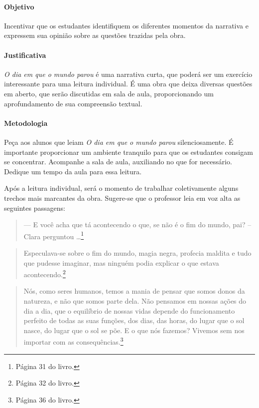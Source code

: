 \documentclass[11pt]{extarticle}
\begin{document}
\paragraph{Objetivo} Incentivar que os estudantes identifiquem os diferentes momentos da narrativa e expressem sua opinião sobre as questões trazidas pela obra.


\paragraph{Justificativa} \textit{O dia em que o mundo parou} é uma narrativa curta, que poderá ser um exercício interessante para uma leitura individual. É uma obra que deixa diversas questões em aberto, que serão discutidas em sala de aula, proporcionando um aprofundamento de sua compreensão textual.

\paragraph{Metodologia} Peça aos alunos que leiam \textit{O dia em que o mundo parou} silenciosamente. É importante proporcionar um ambiente tranquilo para que os estudantes consigam se concentrar. Acompanhe a sala de aula, auxiliando no que for necessário. Dedique um tempo da aula para essa leitura.


Após a leitura individual, será o momento de trabalhar coletivamente alguns trechos mais marcantes da obra. Sugere-se que o professor leia em voz alta as seguintes passagens:

\begin{quote}
— E você acha que tá acontecendo o que, se não é o fim do mundo, pai? – Clara perguntou \ldots{}\footnote{Página 31 do livro.}\end{quote}

\begin{quote}
Especulava-se sobre o fim do mundo, magia negra, profecia maldita e tudo que pudesse imaginar, mas ninguém podia explicar o que estava acontecendo.\footnote{Página 32 do livro.}\end{quote}

\begin{quote}
Nós, como seres humanos, temos a mania de pensar que somos donos da natureza, e não que somos parte dela. Não pensamos em nossas ações do dia a dia, que o equilíbrio de nossas vidas depende do funcionamento perfeito de todas as suas funções, dos dias, das horas, do lugar que o sol nasce, do lugar que o sol se põe. E o que nós fazemos? Vivemos sem nos importar com as consequências.\footnote{Página 36 do livro.}\end{quote}
\end{document}
